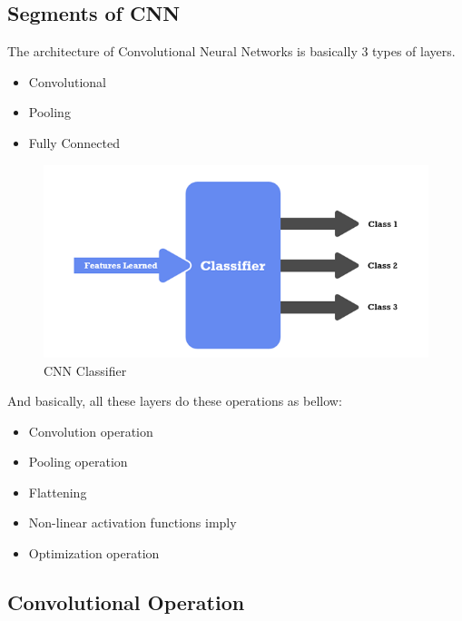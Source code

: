 \newpage
\subsection{Segments of CNN}

\vspace{5mm}
The architecture of Convolutional Neural Networks is basically 3 types of layers.

\begin{itemize}
    \item Convolutional
    \item Pooling
    \item Fully Connected
\end{itemize}

\vspace{5mm}
\begin{figure}[hbt!]
\centering
\includegraphics[scale=1]{images/fig-17.png}
\caption{CNN Classifier}
\label{fig:x CNN Classifier}
\end{figure}

\noindent And basically, all these layers do these operations as bellow:

\vspace{5mm}
\begin{itemize}
    \item Convolution operation
    \item Pooling operation
    \item Flattening
    \item Non-linear activation functions imply
    \item Optimization operation
\end{itemize}

\vspace{5mm}
\subsection{Convolutional Operation}


